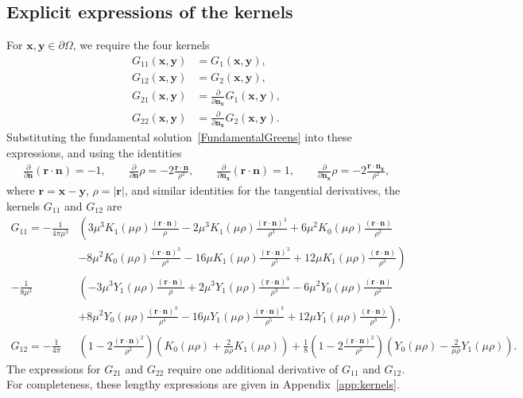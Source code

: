 \documentclass[times]{article}
\newcommand{\bd}{\partial}
\newcommand{\nn}{\mathbf{n}}
\newcommand{\pderiv}[2]{\frac{\partial #1}{\partial #2}}
\newcommand{\rdotn}{\rr \cdot \nn}
\newcommand{\rdotnx}{\rr \cdot \nn_{\xx}}
\newcommand{\rr}{\mathbf{r}}
\newcommand{\xx}{\mathbf{x}}
\newcommand{\yy}{\mathbf{y}}
\begin{document}
\subsection{Explicit expressions of the kernels}
\label{sec:kernels}
For $\xx,\yy \in \bd\Omega$, we require the four kernels
\begin{align*}
  G_{11}(\xx,\yy) &= G_{1}(\xx,\yy), \\
  G_{12}(\xx,\yy) &= G_{2}(\xx,\yy), \\
  G_{21}(\xx,\yy) &= \pderiv{}{\nn_{\xx}}G_{1}(\xx,\yy), \\
  G_{22}(\xx,\yy) &= \pderiv{}{\nn_{\xx}}G_{2}(\xx,\yy).
\end{align*}
Substituting the fundamental solution~\eqref{FundamentalGreens} into
these expressions, and using the identities
\begin{align*}
  \pderiv{}{\nn}(\rdotn) = -1, \qquad
  \pderiv{}{\nn}\rho = -2 \frac{\rdotn}{\rho^{2}}, \qquad
  \pderiv{}{\nn_\xx}(\rdotn) = 1, \qquad
  \pderiv{}{\nn_\xx}\rho = -2 \frac{\rdotnx}{\rho^{2}},
\end{align*}
where $\rr = \xx - \yy$, $\rho = |\rr|$, and similar identities for
the tangential derivatives, the kernels $G_{11}$ and $G_{12}$ are
\begin{align*}
  G_{11} = -\frac{1}{4\pi\mu^2} &\left(
    3\mu^{3}K_{1}(\mu\rho)\frac{(\rdotn)}{\rho} - 
    2\mu^{3}K_{1}(\mu\rho)\frac{(\rdotn)^{3}}{\rho^3} +
    6\mu^{2} K_{0}(\mu\rho)\frac{(\rdotn)}{\rho^{2}} \right. \\
    &\left.
    -8\mu^{2} K_{0}(\mu\rho)\frac{(\rdotn)^{3}}{\rho^{4}} - 
    16\mu K_{1}(\mu\rho)\frac{(\rdotn)^{3}}{\rho^{5}} + 
    12\mu K_{1}(\mu\rho)\frac{(\rdotn)}{\rho^{3}}
    \right) \\
    -\frac{1}{8\mu^{2}}&\left(
    -3\mu^{3}Y_{1}(\mu\rho)\frac{(\rdotn)}{\rho} + 
    2\mu^{3}Y_{1}(\mu\rho)\frac{(\rdotn)^{3}}{\rho^3} -
    6\mu^{2} Y_{0}(\mu\rho)\frac{(\rdotn)}{\rho^{2}} \right. \\
    &\left.
    +8\mu^{2} Y_{0}(\mu\rho)\frac{(\rdotn)^{3}}{\rho^{4}} - 
    16\mu Y_{1}(\mu\rho)\frac{(\rdotn)^{3}}{\rho^{5}} + 
    12\mu Y_{1}(\mu\rho)\frac{(\rdotn)}{\rho^{3}}
    \right), \\
  G_{12} = -\frac{1}{4\pi}&\left(1 - 2\frac{(\rdotn)^2}{\rho^{2}}\right)
    \left(K_{0}(\mu\rho) + \frac{2}{\mu\rho}K_{1}(\mu\rho)\right) 
    +\frac{1}{8}\left(1 - 2\frac{(\rdotn)^{2}}{\rho^{2}}\right)
    \left(Y_{0}(\mu\rho) - \frac{2}{\mu\rho}Y_{1}(\mu\rho)\right).
\end{align*}
The expressions for $G_{21}$ and $G_{22}$ require one additional
derivative of $G_{11}$ and $G_{12}$.  For completeness, these lengthy expressions are given in Appendix~\ref{app:kernels}.
\end{document}
